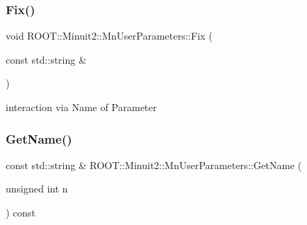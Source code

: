 \subsubsection{\texorpdfstring{Fix()}{Fix()}\hspace{0.1cm}{\footnotesize\ttfamily [4/4]}}
{\footnotesize\ttfamily void R\+O\+O\+T\+::\+Minuit2\+::\+Mn\+User\+Parameters\+::\+Fix (\begin{DoxyParamCaption}\item[{const std\+::string \&}]{ }\end{DoxyParamCaption})}



interaction via Name of Parameter 

\mbox{\label{classROOT_1_1Minuit2_1_1MnUserParameters_a83594fef03edc5f0948e05a290e67fc2}} 
\subsubsection{\texorpdfstring{GetName()}{GetName()}\hspace{0.1cm}{\footnotesize\ttfamily [1/2]}}
{\footnotesize\ttfamily const std\+::string \& R\+O\+O\+T\+::\+Minuit2\+::\+Mn\+User\+Parameters\+::\+Get\+Name (\begin{DoxyParamCaption}\item[{unsigned int}]{n }\end{DoxyParamCaption}) const}

